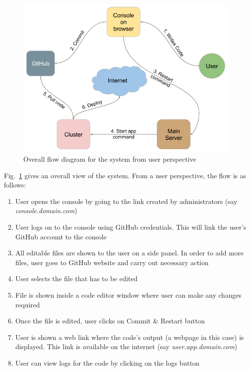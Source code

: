 \documentclass[DD]{iitmdiss}
\begin{document}
\begin{figure}
	\centering
	\includegraphics[width=0.9\linewidth]{img/user_flow}
	\caption[Overall flow diagram for the system]{Overall flow diagram for the system from user perspective}
	\label{fig:userflow}
\end{figure}

Fig.~\ref{fig:userflow} gives an overall view of the system. From a user perspective, the flow is as follows:
\begin{enumerate}
	\item User opens the console by going to the link created by administrators (say \textit{console.domain.com})
	\item User logs on to the console using GitHub credentials. This will link the user's GitHub account to the console
	\item All editable files are shown to the user on a side panel. In order to add more files, user goes to GitHub website and carry out necessary action
	\item User selects the file that has to be edited
	\item File is shown inside a code editor window where user can make any changes required
	\item Once the file is edited, user clicks on Commit \& Restart button
	\item User is shown a web link where the code's output (a webpage in this case) is displayed. This link is available on the internet (say \textit{user.app.domain.com})
	\item User can view logs for the code by clicking on the logs button
	
\end{enumerate}
\end{document}
